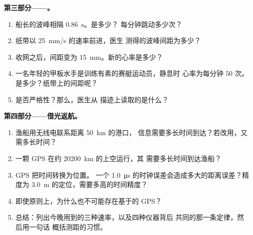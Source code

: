 \begin{problem}[{周末问题——读懂世界的信号：一条
定律，$d = v\,t$，用来测定风暴距离、绘制海床、计数心跳，并
探究 GPS 的工作原理}]
\medskip
\noindent\textbf{第三部分——。}
\begin{enumerate}[resume]
  \item 船长的波峰相隔 \qty{0.86}{s}。是多少？
        每分钟跳动多少次？
  \item 纸带以 \qty{25}{mm/s} 的速率前进，医生
        测得的波峰间距为多少？
  \item 收网之后，间距变为 \qty{15}{mm}。新的心率是多少？
  \item 一名年轻的甲板水手是训练有素的赛艇运动员，静息时
        心率为每分钟 $50$ 次。是多少？纸带上的间距呢？
  \item {}是否严格性？那么，医生从
        描迹上读取的是什么？
\end{enumerate}

\medskip
\noindent\textbf{第四部分——借光返航。}
\begin{enumerate}[resume]
  \item 渔船用无线电联系距离 \qty{50}{km} 的港口，
        信息需要多长时间到达？若改用，又需多长时间？
  \item 一颗 GPS 在约 \qty{20200}{km} 的上空运行，其
        需要多长时间到达渔船？
  \item GPS 把时间转换为位置。
        一个 \qty{1.0}{\micro s} 的时钟误差会造成多大的距离误差？精度为
        \qty{3.0}{m} 的定位，需要多高的时间精度？
  \item 即使原则上，为什么也不可能存在基于的 GPS？
  \item 总结：列出今晚用到的三种速率，以及四种仪器背后
        共同的那一条定律，然后用一句话
        概括测距的习惯。
\end{enumerate}
\end{problem}
